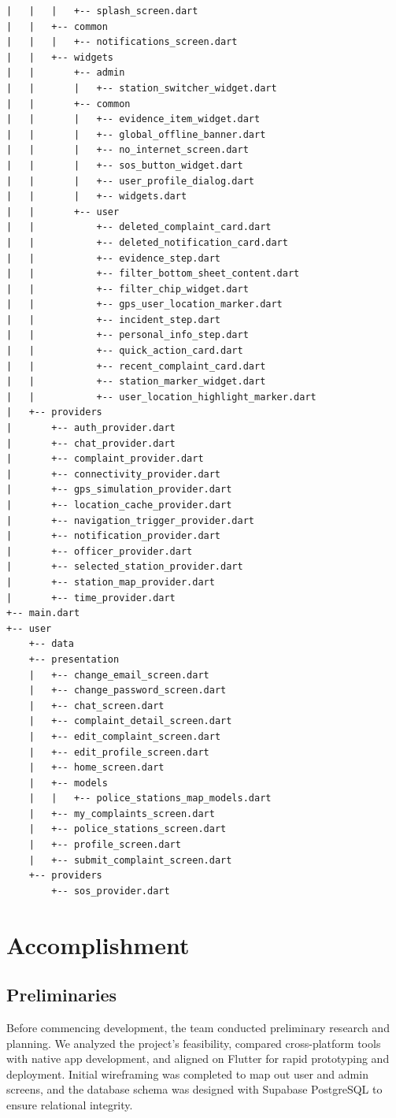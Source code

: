 \documentclass[12pt, a4paper, twoside, openany]{report}
\begin{document}
\begin{footnotesize}
\begin{verbatim}
|   |   |   +-- splash_screen.dart
|   |   +-- common
|   |   |   +-- notifications_screen.dart
|   |   +-- widgets
|   |       +-- admin
|   |       |   +-- station_switcher_widget.dart
|   |       +-- common
|   |       |   +-- evidence_item_widget.dart
|   |       |   +-- global_offline_banner.dart
|   |       |   +-- no_internet_screen.dart
|   |       |   +-- sos_button_widget.dart
|   |       |   +-- user_profile_dialog.dart
|   |       |   +-- widgets.dart
|   |       +-- user
|   |           +-- deleted_complaint_card.dart
|   |           +-- deleted_notification_card.dart
|   |           +-- evidence_step.dart
|   |           +-- filter_bottom_sheet_content.dart
|   |           +-- filter_chip_widget.dart
|   |           +-- gps_user_location_marker.dart
|   |           +-- incident_step.dart
|   |           +-- personal_info_step.dart
|   |           +-- quick_action_card.dart
|   |           +-- recent_complaint_card.dart
|   |           +-- station_marker_widget.dart
|   |           +-- user_location_highlight_marker.dart
|   +-- providers
|       +-- auth_provider.dart
|       +-- chat_provider.dart
|       +-- complaint_provider.dart
|       +-- connectivity_provider.dart
|       +-- gps_simulation_provider.dart
|       +-- location_cache_provider.dart
|       +-- navigation_trigger_provider.dart
|       +-- notification_provider.dart
|       +-- officer_provider.dart
|       +-- selected_station_provider.dart
|       +-- station_map_provider.dart
|       +-- time_provider.dart
+-- main.dart
+-- user
    +-- data
    +-- presentation
    |   +-- change_email_screen.dart
    |   +-- change_password_screen.dart
    |   +-- chat_screen.dart
    |   +-- complaint_detail_screen.dart
    |   +-- edit_complaint_screen.dart
    |   +-- edit_profile_screen.dart
    |   +-- home_screen.dart
    |   +-- models
    |   |   +-- police_stations_map_models.dart
    |   +-- my_complaints_screen.dart
    |   +-- police_stations_screen.dart
    |   +-- profile_screen.dart
    |   +-- submit_complaint_screen.dart
    +-- providers
        +-- sos_provider.dart
\end{verbatim}
\end{footnotesize}
\chapter{Accomplishment}
\section{Preliminaries}
Before commencing development, the team conducted preliminary research and planning. We analyzed the project's feasibility, compared cross-platform tools with native app development, and aligned on Flutter for rapid prototyping and deployment. Initial wireframing was completed to map out user and admin screens, and the database schema was designed with Supabase PostgreSQL to ensure relational integrity.
\end{document}
